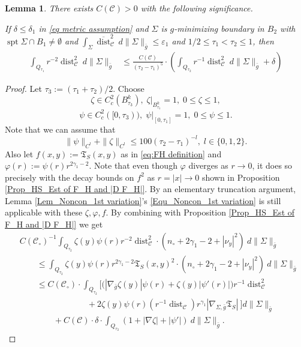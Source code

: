 \documentclass[11pt, letterpaper, reqno]{amsart}
\numberwithin{equation}{section}
\newtheorem{Lem}[Def]{Lemma}
\theoremstyle{remark}
\newcommand{\cC}{\mathcal{C}}
\newcommand{\frT}{\mathfrak{T}}
\newcommand{\supp}{\operatorname{spt}}
\newcommand{\dist}{\operatorname{dist}}
\newcommand{\Sdist}{\overline{\dist}}
\newcommand{\eps}{\varepsilon}
\begin{document}
   
   \begin{Lem} \label{Lem_Noncon_weak Noncon}
    There exists $C(\cC) > 0$ with the following significance. 
    
    If $\delta \leq \delta_1$ in \eqref{eq metric assumption} and $\Sigma$ is $g$-minimizing boundary in $B_2$ with $\supp \Sigma \cap B_1 \neq \emptyset$ and $\int_{\Sigma}\Sdist_\cC^2\, d\|\Sigma\|_{\bar g} \leq \eps_1$ and $1/2 \leq\tau_1<\tau_2\leq 1$, then
    \begin{align*}
      \int_{Q_{\tau_1}} r^{-2}\dist_\cC^2 \ d\|\Sigma\|_{\bar g} 
      & \leq \frac{C(\cC)}{(\tau_2-\tau_1)^5}\cdot \left( \int_{Q_{\tau_2}} r^{-1}\dist_\cC^2\ d\|\Sigma\|_{\bar g} + \delta \right) 
    \end{align*}
   \end{Lem}
   \begin{proof}
    Let $\tau_3:=(\tau_1+\tau_2)/2$. Choose
    \[ \zeta\in C^2_c(B^k_{\tau_3}), \; \zeta|_{B^k_{\tau_1}} = 1, \; 0 \leq \zeta \leq 1, \]
    \[ \psi\in C_c^2([0, \tau_3)), \; \psi|_{[0, \tau_1]} = 1, \; 0 \leq \psi \leq 1. \]
    Note that we can assume that
    \[ \|\psi\|_{C^l}+\|\zeta\|_{C^l}\leq 100 (\tau_2-\tau_1)^{-l}, \; l\in \{0, 1, 2\}. \]
    Also let $f(x, y):= \frT_{{S}}(x, y)$ as in \eqref{eq:FH definition} and $\varphi(r) := \psi(r)r^{2\gamma_1-2}$. Note that even though $\varphi$ diverges as $r \to 0$, it does so precisely with the decay bounds on $f^2$ as $r = |x| \to 0$ shown in Proposition \ref{Prop_HS_Est of F_H and |D F_H|}. By an elementary truncation argument, Lemma \ref{Lem_Noncon_1st variation}'s \eqref{Equ_Noncon_1st variation} is still applicable with these $\zeta, \varphi, f$. By combining with Proposition \ref{Prop_HS_Est of F_H and |D F_H|} we get 
    \begin{align*}
     & C(\cC_\circ)^{-1}\int_{Q_{\tau_2}} \zeta(y)\psi(r)r^{-2}\dist_\cC^2\cdot (n_\circ + 2\gamma_1-2 + |\nu_y|^2)\ d\|\Sigma\|_{\bar g} \\
     & \qquad \leq \int_{Q_{\tau_2}} \zeta(y)\psi(r)r^{2\gamma_1-2}\frT_{{S}}(x, y)^2 \cdot (n_\circ + 2\gamma_1-2 + |\nu_y|^2)\ d\|\Sigma\|_{\bar g} \\
     & \qquad \leq C(\cC_\circ) \cdot \int_{Q_{\tau_2}} \Big[ \Big(|\nabla_{\bar g} \zeta(y)|\psi(r) + \zeta(y)|\psi'(r)|\Big)r^{-1}\dist_\cC^2 \\
     & \qquad\qquad\qquad\qquad  + 2\zeta(y)\psi(r)\left(r^{-1}\dist_\cC \right) r^{\gamma_1}|\nabla_{\Sigma,\bar g} \frT_{{S}}|\ \Big] d\|\Sigma\|_{\bar g}\\
     & \qquad \qquad + C(\cC) \cdot \delta \cdot \int_{Q_{\tau_2}} (1+|\nabla \zeta| + |\psi'|) \ d\|\Sigma\|_{\bar g}.

\end{align*}
\end{proof}
\end{document}

